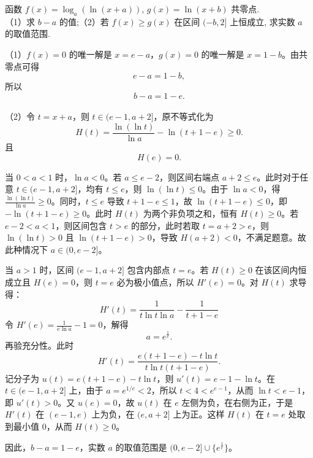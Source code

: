 \newpage
\begin{example}[共零点问题]
    函数 $f(x) = \log_a(\ln(x + a))$, $g(x) = \ln(x + b)$ 共零点.\\
（1）求 $b - a$ 的值;（2）若 $f(x) \geq g(x)$ 在区间 $(-b, 2]$ 上恒成立, 求实数 $a$ 的取值范围.
\end{example}
\begin{solution}
（1）$f(x)=0$ 的唯一解是 $x=e-a$，$g(x)=0$ 的唯一解是 $x=1-b$。由共零点可得
\[
e-a=1-b,
\]
所以
\[
b-a=1-e.
\]
\\
（2）令 $t=x+a$，则 $t\in(e-1,a+2]$，原不等式化为
\[
H(t)=\frac{\ln(\ln t)}{\ln a}-\ln(t+1-e)\ge0.
\]
且
\[
H(e)=0.
\]

当 $0 < a < 1$ 时，$\ln a < 0$。若 $a \le e - 2$，则区间右端点 $a + 2 \le e$。此时对于任意 $t \in (e - 1, a + 2]$，均有 $t \le e$，则 $\ln(\ln t) \le 0$。由于 $\ln a < 0$，得 $\frac{\ln(\ln t)}{\ln a} \ge 0$。同时，$t \le e$ 导致 $t + 1 - e \le 1$，故 $\ln(t + 1 - e) \le 0$，即 $-\ln(t + 1 - e) \ge 0$。此时 $H(t)$ 为两个非负项之和，恒有 $H(t) \ge 0$。若 $e - 2 < a < 1$，则区间包含 $t > e$ 的部分，此时若取 $t = a + 2 > e$，则 $\ln(\ln t) > 0$ 且 $\ln(t + 1 - e) > 0$，导致 $H(a + 2) < 0$，不满足题意。故此种情况下 $a \in (0, e - 2]$。

当 $a > 1$ 时，区间 $(e - 1, a + 2]$ 包含内部点 $t = e$。若 $H(t) \ge 0$ 在该区间内恒成立且 $H(e) = 0$，则 $t = e$ 必为极小值点，所以 $H'(e) = 0$。对 $H(t)$ 求导得：
$$H'(t) = \frac{1}{t \ln t \ln a} - \frac{1}{t + 1 - e}$$
令 $H'(e)=\frac{1}{e\ln a}-1=0$，解得
\[
a=e^{\frac{1}{e}}.
\]
再验充分性。此时
\[
H'(t)=\frac{e(t+1-e)-t\ln t}{t\ln t(t+1-e)}.
\]
记分子为 $u(t)=e(t+1-e)-t\ln t$，则 $u'(t)=e-1-\ln t$。在 $t\in(e-1,a+2]$ 上，由于 $a=e^{1/e}<2$，所以 $t<4<e^{e-1}$，从而 $\ln t<e-1$，即 $u'(t)>0$。又 \(u(e)=0\)，故 \(u(t)\) 在 \(e\) 左侧为负，在右侧为正，于是 \(H'(t)\) 在 \((e-1,e)\) 上为负，在 \((e,a+2]\) 上为正。这样 \(H(t)\) 在 \(t=e\) 处取到最小值 \(0\)，从而 \(H(t)\ge0\)。

因此，$b - a = 1 - e$，实数 $a$ 的取值范围是 $(0, e - 2] \cup \{ e^{\frac{1}{e}} \}$。
\end{solution}

